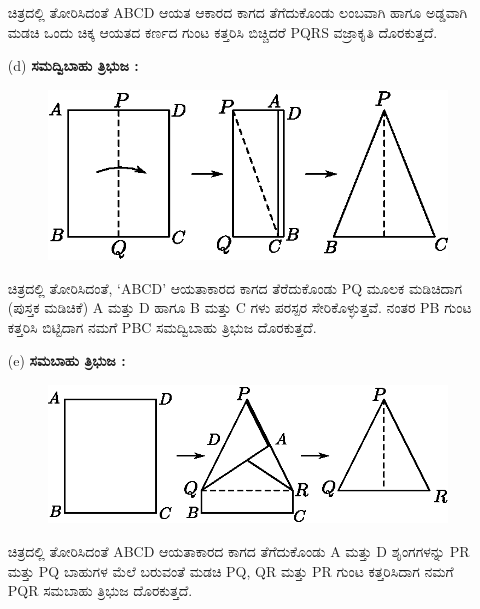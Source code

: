 \begin{itemize}
ಚಿತ್ರದಲ್ಲಿ ತೋರಿಸಿದಂತೆ  ABCD ಆಯತ ಆಕಾರದ ಕಾಗದ ತೆಗೆದುಕೊಂಡು ಲಂಬವಾಗಿ ಹಾಗೂ ಅಡ್ಡವಾಗಿ ಮಡಚಿ ಒಂದು ಚಿಕ್ಕ ಆಯತದ ಕರ್ಣದ ಗುಂಟ ಕತ್ತರಿಸಿ ಬಿಚ್ಚಿದರೆ PQRS ವಜ್ರಾಕೃತಿ ದೊರಕುತ್ತದೆ. 

\item[(d)] \textbf{ಸಮದ್ವಿಬಾಹು ತ್ರಿಭುಜ :}
\begin{figure}[H]
\centering
\includegraphics[scale=.98]{src/figure/chap1/fig1-15d.eps}
\end{figure}

ಚಿತ್ರದಲ್ಲಿ ತೋರಿಸಿದಂತೆ, `ABCD' ಆಯತಾಕಾರದ ಕಾಗದ ತೆರೆದುಕೊಂಡು PQ ಮೂಲಕ ಮಡಿಚಿದಾಗ (ಪುಸ್ತಕ ಮಡಿಚಿಕೆ) A ಮತ್ತು D ಹಾಗೂ  B ಮತ್ತು  C ಗಳು ಪರಸ್ಪರ ಸೇರಿಕೊಳ್ಳುತ್ತವೆ. ನಂತರ PB ಗುಂಟ ಕತ್ತರಿಸಿ ಬಿಟ್ಟಿದಾಗ ನಮಗೆ  PBC ಸಮದ್ವಿಬಾಹು ತ್ರಿಭುಜ ದೊರಕುತ್ತದೆ. 


\item[(e)] \textbf{ಸಮಬಾಹು ತ್ರಿಭುಜ : }
\begin{figure}[H]
\centering
\includegraphics[scale=.8]{src/figure/chap1/fig1-15e.eps}
\end{figure}

ಚಿತ್ರದಲ್ಲಿ ತೋರಿಸಿದಂತೆ ABCD ಆಯತಾಕಾರದ ಕಾಗದ ತೆಗೆದುಕೊಂಡು A ಮತ್ತು  D ಶೃಂಗಗಳನ್ನು PR ಮತ್ತು PQ  ಬಾಹುಗಳ ಮೆಲೆ ಬರುವಂತೆ ಮಡಚಿ  PQ, QR ಮತ್ತು PR ಗುಂಟ ಕತ್ತರಿಸಿದಾಗ ನಮಗೆ PQR ಸಮಬಾಹು ತ್ರಿಭುಜ ದೊರಕುತ್ತದೆ. 
\end{itemize}

